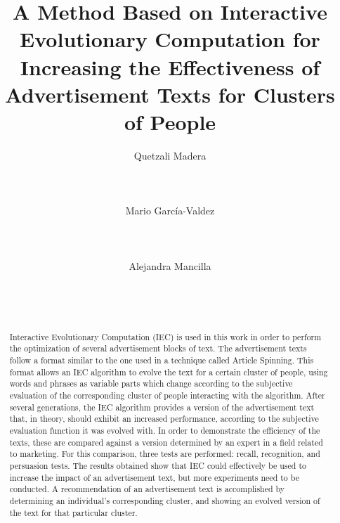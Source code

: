 \documentclass{acm_proc_article-sp}
\begin{document}
\title{A Method Based on Interactive Evolutionary Computation for
  Increasing the Effectiveness of Advertisement Texts for Clusters of People}


\author{
\alignauthor
Quetzali Madera\\
       \\
       \\
       \\
\alignauthor
Mario Garc\'ia-Valdez\\
       \\
       \\
       \\
\alignauthor
Alejandra Mancilla\\
       \\
       \\
       \\
}

\maketitle
\begin{abstract}
Interactive Evolutionary Computation (IEC) is used in this work in
order to perform the optimization of several advertisement blocks of
text. The advertisement texts follow a format
similar to the one used in a technique called Article Spinning. This
format allows an IEC algorithm to evolve the text for a certain
cluster of people, using words and phrases as variable
parts which change according to the subjective evaluation of the
corresponding cluster of people interacting with the algorithm. After
several generations, the IEC algorithm provides a version of the
advertisement text that, in theory, should exhibit an increased
performance, according to the subjective evaluation function it was
evolved with. In order to demonstrate the efficiency of the texts,
these are compared against a version determined by an expert in a
field related to marketing. For this comparison, three tests are
performed: recall, recognition, and persuasion tests. The results
obtained show that IEC could effectively be used to increase the
impact of an advertisement text, but more experiments need to be
conducted. A recommendation of an advertisement text is accomplished
by determining an individual's corresponding cluster, and showing an
evolved version of the text for that particular cluster.
\end{abstract}
\end{document}
